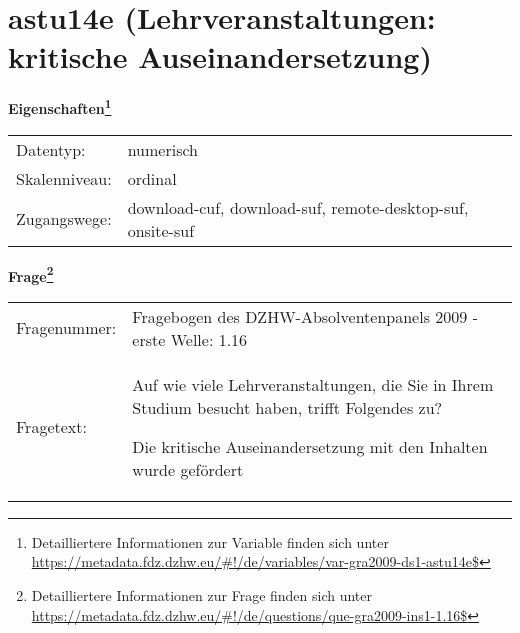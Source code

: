 
    \setcounter{footnote}{0}

    \vspace*{-1.8cm}
	\section{astu14e (Lehrveranstaltungen: kritische Auseinandersetzung)}
	\label{section:astu14e}



    \vspace*{0.5cm}
    \noindent\textbf{Eigenschaften\footnote{Detailliertere Informationen zur Variable finden sich unter
		\url{https://metadata.fdz.dzhw.eu/\#!/de/variables/var-gra2009-ds1-astu14e$}}}\\
	\begin{tabularx}{\hsize}{@{}lX}
	Datentyp: & numerisch \\
	Skalenniveau: & ordinal \\
	Zugangswege: &
	  download-cuf, 
	  download-suf, 
	  remote-desktop-suf, 
	  onsite-suf
 \\
    \end{tabularx}



				\vspace*{0.5cm}
                \noindent\textbf{Frage\footnote{Detailliertere Informationen zur Frage finden sich unter
		              \url{https://metadata.fdz.dzhw.eu/\#!/de/questions/que-gra2009-ins1-1.16$}}}\\
				\begin{tabularx}{\hsize}{@{}lX}
					Fragenummer: &
					  Fragebogen des DZHW-Absolventenpanels 2009 - erste Welle:
					  1.16
 \\
					Fragetext: & Auf wie viele Lehrveranstaltungen, die Sie in Ihrem Studium besucht haben, trifft Folgendes zu?\par  Die kritische Auseinandersetzung mit den Inhalten wurde gefördert \\
				\end{tabularx}





